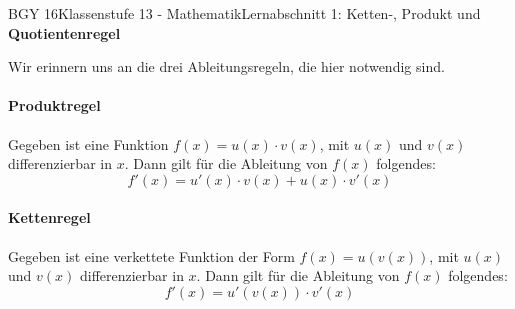 \documentclass[oneside,openany,headings=optiontotoc,11pt,numbers=noenddot]{scrreprt}
\begin{document}
	\begin{worksheet}{BGY 16}{Klassenstufe 13 - Mathematik}{Lernabschnitt 1: Ketten-, Produkt und \textbf{Quotientenregel}}
				
		\begin{framed}
			\noindent
			Wir erinnern uns an die drei Ableitungsregeln, die hier notwendig sind.
			\paragraph{Produktregel} Gegeben ist eine Funktion \(f(x) = u(x)\cdot{}v(x)\), mit \(u(x)\) und \(v(x)\) differenzierbar in \(x\). Dann gilt für die Ableitung von \(f(x)\) folgendes:
			\[f'(x) = u'(x)\cdot{}v(x) + u(x)\cdot{}v'(x)\]
			\paragraph{Kettenregel} Gegeben ist eine verkettete Funktion der Form \(f(x) = u(v(x))\), mit \(u(x)\) und \(v(x)\) differenzierbar in \(x\). Dann gilt für die Ableitung von \(f(x)\) folgendes:
			\[f'(x) = u'(v(x))\cdot{}v'(x)\]

\end{framed}
\end{worksheet}
\end{document}
